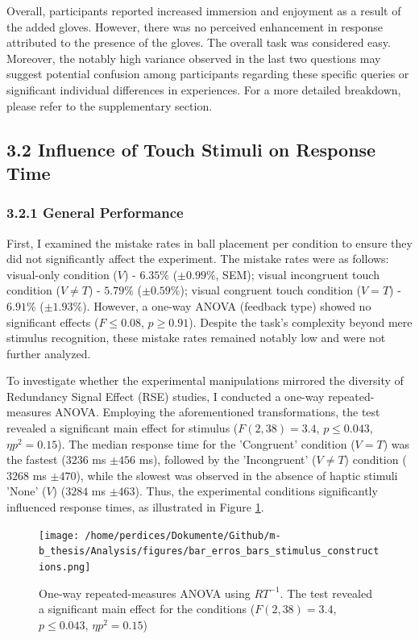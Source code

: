 \documentclass[12pt,oneside,openright]{report}
\begin{document}
Overall, participants reported increased immersion and enjoyment as a result of the added gloves. However, there was no perceived enhancement in response attributed to the presence of the gloves. The overall task was considered easy. Moreover, the notably high variance observed in the last two questions may suggest potential confusion among participants regarding these specific queries or significant individual differences in experiences. For a more detailed breakdown, please refer to the supplementary section.
    
\subsection*{3.2 Influence of Touch Stimuli on Response Time}
\subsubsection*{3.2.1 General Performance}

First, I examined the mistake rates in ball placement per condition to ensure they did not significantly affect the experiment. The mistake rates were as follows: visual-only condition ($V$) - $6.35\%$ ($\pm 0.99\%$, SEM); visual incongruent touch condition ($V \neq T$) - $5.79\%$ ($\pm 0.59\%$); visual congruent touch condition ($V=T$) - $6.91\%$ ($\pm 1.93\%$). However, a one-way ANOVA (feedback type) showed no significant effects ($ F \leq 0.08$, $p \geq 0.91$). Despite the task's complexity beyond mere stimulus recognition, these mistake rates remained notably low and were not further analyzed.

To investigate whether the experimental manipulations mirrored the diversity of Redundancy Signal Effect (RSE) studies, I conducted a one-way repeated-measures ANOVA. Employing the aforementioned transformations, the test revealed a significant main effect for stimulus ($F(2,38) = 3.4$, $p \leq 0.043$, $\eta p^2 = 0.15$). The median response time for the 'Congruent' condition ($V=T$) was the fastest ($3236$ ms $\pm 456$ ms), followed by the 'Incongruent' ($V \neq T$) condition ($3268$ ms $\pm 470$), while the slowest was observed in the absence of haptic stimuli 'None' ($V$) ($3284$ ms $\pm 463$). Thus, the experimental conditions significantly influenced response times, as illustrated in Figure \ref{fig:error}.

\begin{figure}[!ht]
    \centering
    \texttt{[image: /home/perdices/Dokumente/Github/m-b\_thesis/Analysis/figures/bar\_erros\_bars\_stimulus\_constructions.png]}
    \caption{One-way repeated-measures ANOVA using $RT^{-1}$. The test revealed a significant main effect for the conditions ($F(2,38) = 3.4$, $p \leq 0.043$, $\eta p^2 = 0.15$)}
    \label{fig:error}
\end{figure}
\end{document}
